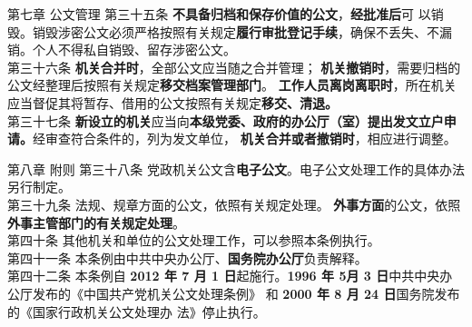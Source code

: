 \documentclass[aspectratio=169]{beamer}
\begin{document}
\begin{frame}[t]{第七章 公文管理} \vspace{20pt}
    第三十五条 \textbf{不具备归档和保存价值的公文}，\textbf{经批准后}可
    以销毁。销毁涉密公文必须严格按照有关规定\textbf{履行审批登记手续}，确保不丢失、不漏销。个人不得私自销毁、留存涉密公文。\\
    第三十六条 \textbf{机关合并时}，全部公文应当随之合并管理；
    \textbf{机关撤销时}，需要归档的公文经整理后按照有关规定\textbf{移交档案管理部门}。
    \textbf{工作人员离岗离职时}，所在机关应当督促其将暂存、借用的公文按照有关规定\textbf{移交、清退。}\\
    第三十七条 \textbf{新设立的机关}应当向\textbf{本级党委、政府的办公厅（室）提出发文立户申请。}经审查符合条件的，列为发文单位，
    \textbf{机关合并或者撤销时}，相应进行调整。
\end{frame}



\begin{frame}[t]{第八章 附则} \vspace{20pt}
    第三十八条 党政机关公文含\textbf{电子公文}。电子公文处理工作的具体办法另行制定。\\

    第三十九条 法规、规章方面的公文，依照有关规定处理。
    \textbf{外事方面}的公文，依照\textbf{外事主管部门的有关规定处理}。\\

    第四十条 其他机关和单位的公文处理工作，可以参照本条例执行。\\

    第四十一条 本条例由中共中央办公厅、\textbf{国务院办公厅}负责解释。\\

    第四十二条 本条例自 \textbf{2012 年 7 月 1 日}起施行。\textbf{1996 年 5月 3 日}中共中央办公厅发布的《中国共产党机关公文处理条例》
    和 \textbf{2000 年 8 月 24 日}国务院发布的《国家行政机关公文处理办
    法》停止执行。\\
\end{frame}
\end{document}
